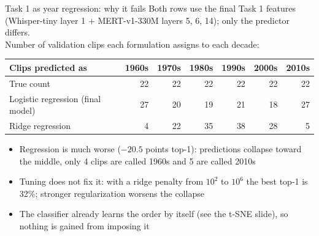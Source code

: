 \documentclass[aspectratio=169,11pt]{beamer}
\begin{document}
\begin{frame}[t]{Task 1 as year regression: why it fails}
  \small
  Both rows use the final Task 1 features (Whisper-tiny layer 1 + MERT-v1-330M layers 5, 6, 14); only the predictor differs.\\
  Number of validation clips each formulation assigns to each decade:
  \vspace{0.5em}

  \centering
  {\footnotesize\setlength{\tabcolsep}{7pt}
  \begin{tabular}{@{}lrrrrrr@{}}
    \toprule
    Clips predicted as & 1960s & 1970s & 1980s & 1990s & 2000s & 2010s \\ \midrule
    True count     & 22 & 22 & 22 & 22 & 22 & 22 \\
    Logistic regression (final model) & 27 & 20 & 19 & 21 & 18 & 27 \\
    Ridge regression     & \alert{4} & 22 & 35 & 38 & 28 & \alert{5} \\
    \bottomrule
  \end{tabular}}
  \vspace{0.8em}

  \raggedright
  \begin{itemize}
    \item \alert{Regression is much worse} ($-20.5$ points top-1): predictions collapse toward the middle, only 4 clips are called 1960s and 5 are called 2010s
    \item Tuning does not fix it: with a ridge penalty from $10^2$ to $10^6$ the best top-1 is 32\%; stronger regularization worsens the collapse
    \item The classifier already learns the order by itself (see the t-SNE slide), so nothing is gained from imposing it
  \end{itemize}
\end{frame}
\end{document}
